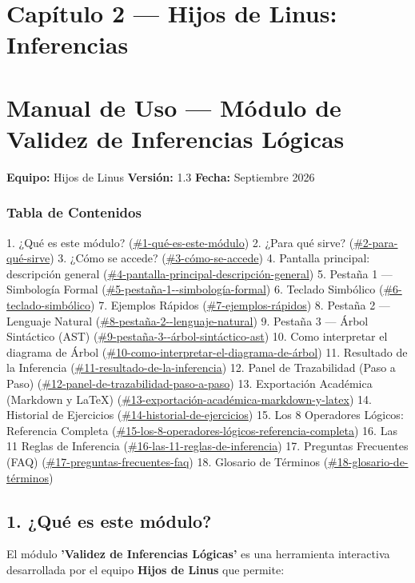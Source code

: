 \documentclass[11pt,a4paper]{article}
\begin{document}
\section{Cap\'itulo 2 --- Hijos de Linus: Inferencias}
\section{Manual de Uso --- Módulo de Validez de Inferencias Lógicas}

\textbf{Equipo:} Hijos de Linus
\textbf{Versión:} 1.3
\textbf{Fecha:} Septiembre 2026

\hrulefill

\subsubsection{Tabla de Contenidos}

1. ¿Qué es este módulo? (\url{#1-qué-es-este-módulo})
2. ¿Para qué sirve? (\url{#2-para-qué-sirve})
3. ¿Cómo se accede? (\url{#3-cómo-se-accede})
4. Pantalla principal: descripción general (\url{#4-pantalla-principal-descripción-general})
5. Pestaña 1 --- Simbología Formal (\url{#5-pestaña-1--simbología-formal})
6. Teclado Simbólico (\url{#6-teclado-simbólico})
7. Ejemplos Rápidos (\url{#7-ejemplos-rápidos})
8. Pestaña 2 --- Lenguaje Natural (\url{#8-pestaña-2--lenguaje-natural})
9. Pestaña 3 --- Árbol Sintáctico (AST) (\url{#9-pestaña-3--árbol-sintáctico-ast})
10. Como interpretar el diagrama de Árbol (\url{#10-como-interpretar-el-diagrama-de-árbol})
11. Resultado de la Inferencia (\url{#11-resultado-de-la-inferencia})
12. Panel de Trazabilidad (Paso a Paso) (\url{#12-panel-de-trazabilidad-paso-a-paso})
13. Exportación Académica (Markdown y LaTeX) (\url{#13-exportación-académica-markdown-y-latex})
14. Historial de Ejercicios (\url{#14-historial-de-ejercicios})
15. Los 8 Operadores Lógicos: Referencia Completa (\url{#15-los-8-operadores-lógicos-referencia-completa})
16. Las 11 Reglas de Inferencia (\url{#16-las-11-reglas-de-inferencia})
17. Preguntas Frecuentes (FAQ) (\url{#17-preguntas-frecuentes-faq})
18. Glosario de Términos (\url{#18-glosario-de-términos})

\hrulefill

\subsection{1. ¿Qué es este módulo?}

El módulo \textbf{'Validez de Inferencias Lógicas'} es una herramienta interactiva desarrollada por el equipo \textbf{Hijos de Linus} que permite:
\end{document}
